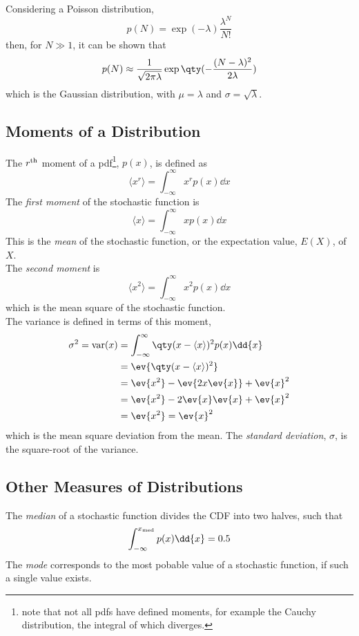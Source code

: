 \documentclass{dwnotes}         		        %
\begin{document}
Considering a Poisson distribution,
\[ p(N) = \exp(-\lambda) \frac{\lambda^N}{N!} \]
then, for $N\gg1$, it can be shown that 
\[ p(N) \approx \frac{1}{\sqrt{2 \pi \lambda}} \exp\qty(- \frac{(N-\lambda)^2}{2 \lambda}) \] which is the Gaussian distribution, with $\mu = \lambda$ and $\sigma = \sqrt{\lambda}$.

\subsection{Moments of a Distribution}
\label{sec:moments}

The $r^{\rm th}$ moment of a pdf\footnote{note that not all pdfs have defined moments, for example the Cauchy distribution, the integral of which diverges.}, $p(x)$, is defined as 
\begin{equation}
  \label{eq:moment}
  \langle x^r \rangle = \int_{-\infty}^{\infty} x^r p(x) \dd{x}
\end{equation}
The \emph{first moment} of the stochastic function is
\[ \langle x \rangle = \int_{-\infty}^{\infty} x p(x) \dd{x} \] This
is the {\em mean} of the stochastic function, or the expectation
value, $E(X)$, of $X$.\\
The \emph{second moment} is
\[ \langle x^2 \rangle = \int_{-\infty}^{\infty} x^2 p(x) \dd{x} \]
which is the mean square of the stochastic function. \\ The variance is defined in terms of this moment,
\begin{align}
  \label{eq:variance}
  \sigma^2 = {\rm var}(x) &= \int_{-\infty}^{\infty} \qty( x - \langle x \rangle)^2 p(x) \dd{x} \\
          &= \ev{\qty(x - \langle x \rangle )^2 } \nonumber \\
          &= \ev{x^2} - \ev{2x \ev{x}} + \ev{x}^2  \nonumber\\
          &= \ev{x^2} - 2 \ev{x} \ev{x} + \ev{x}^2 \nonumber\\
          &= \ev{x^2} = \ev{x}^2
\end{align}
which is the mean square deviation from the mean.
The {\em standard deviation}, $\sigma$, is the square-root of the variance.

\subsection{Other Measures of Distributions}
\label{sec:measures}

The \emph{median} of a stochastic function divides the CDF into two halves, such that
\begin{equation}
  \label{eq:median}
  \int_{-\infty}^{x_{\rm med}} p(x) \dd{x} = 0.5
\end{equation}
The \emph{mode} corresponds to the most pobable value of a stochastic function, if such a single value exists.
\end{document}
